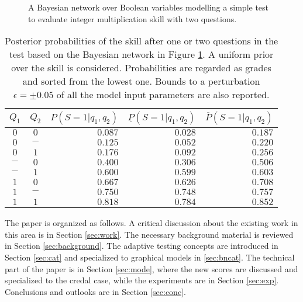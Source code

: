 \documentclass[runningheads]{llncs}
\begin{document}
\begin{figure}[htp!]
\centering
{}
\caption{A Bayesian network over Boolean variables modelling a simple test to evaluate integer multiplication skill with two questions.}
\label{fig:minicat}
\end{figure}
\begin{table}[htbp!]
\centering
\caption{Posterior probabilities of the skill after one or two questions in the test based on the Bayesian network in Figure \ref{fig:minicat}. A uniform prior over the skill is considered. Probabilities are regarded as grades and sorted from the lowest one. Bounds to a perturbation $\epsilon=\pm 0.05$ of all the model input parameters are also reported.}
\begin{tabular}{@{}ccrrr@{}}
\toprule
$Q_1$&$Q_2$&$P(S=1|q_1,q_2)$&
$\underline{P}(S=1|q_1,q_2)$&
$\overline{P}(S=1|q_1,q_2)$
\\
\midrule
$0$&$0$&$0.087$&$0.028$&$0.187$\\
$0$&$-$&$0.125$&$0.052$&$0.220$\\
$0$&$1$&$0.176$&$0.092$&$0.256$\\
$-$&$0$&$0.400$&$0.306$&$0.506$\\
$-$&$1$&$0.600$&$0.599$&$0.603$\\
$1$&$0$&$0.667$&$0.626$&$0.708$\\
$1$&$-$&$0.750$&$0.748$&$0.757$\\
$1$&$1$&$0.818$& $0.784$ &$0.852$\\
\bottomrule
\end{tabular}
\label{tab:minicat}
\end{table}
The paper is organized as follows. A critical discussion about the existing work in this area is in Section \ref{sec:work}. The necessary background material is reviewed in Section \ref{sec:background}. The adaptive testing concepts are introduced in Section \ref{sec:cat} and specialized to graphical models in \ref{sec:bncat}. The technical part of the paper is in Section \ref{sec:mode}, where the new scores are discussed and specialized to the credal case, while the experiments are in Section \ref{sec:exp}. Conclusions and outlooks are in Section \ref{sec:conc}.
\end{document}

